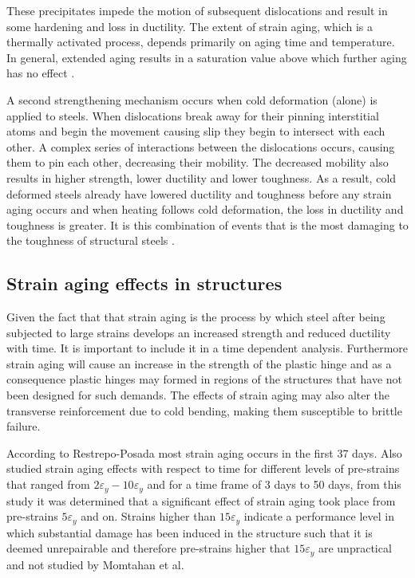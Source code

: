 These precipitates impede the motion of subsequent dislocations and result in some hardening and loss in ductility. The extent of strain aging, which is a thermally activated process, depends primarily on aging time and temperature. In general, extended aging results in a saturation value above which further aging has no effect \cite{Restrepo-Posada1994}.

A second strengthening mechanism occurs when cold deformation (alone) is applied to steels. When dislocations break away for their pinning interstitial atoms and begin the movement causing slip they begin to intersect with each other. A complex series of interactions between the dislocations occurs, causing them to pin each other, decreasing their mobility. The decreased mobility also results in higher strength, lower ductility and lower toughness. As a result, cold deformed steels already have lowered ductility and toughness before any strain aging occurs and when heating follows cold deformation, the loss in ductility and toughness is greater. It is this combination of events that is the most damaging to the toughness of structural steels \cite{Momtahan2009}.

\subsection{Strain aging effects in structures}

Given the fact that that strain aging is the process by which steel after being subjected to large strains develops an increased strength and reduced ductility with time. It is  important to include it in a time dependent analysis. Furthermore strain aging will cause an increase in the strength of the plastic hinge and as a consequence plastic hinges may formed in regions of the structures that have not been designed for such demands. The effects of strain aging may also alter the transverse reinforcement due to cold bending, making them susceptible to brittle failure\cite{Momtahan2009}.

According to Restrepo-Posada\cite{Restrepo-Posada1994} most strain aging occurs in the first 37 days. Also \cite{Momtahan2009} studied strain aging effects with respect to time for different levels of pre-strains that ranged from $2\varepsilon_y - 10\varepsilon_y$ and for a time frame of 3 days to 50 days, from this study it was determined that a significant effect of strain aging took place from pre-strains $5\varepsilon_y$ and on. Strains higher than $15\varepsilon_y$ indicate a performance level in which substantial damage has been induced in the structure such that it is deemed unrepairable and therefore pre-strains higher that $15\varepsilon_y$ are unpractical and not studied by Momtahan et al\cite{Momtahan2009}.

